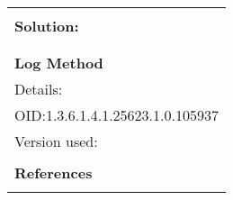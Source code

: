 \documentclass{article}
\begin{document}
\begin{longtable}{|p{}|}
          \hline
          \\
\textbf{Solution:}\\
\\


        \hline
        \\
\textbf{Log Method}\\
Details:
\rowcolor{white}{\verb=OS Detection Consolidation and Reporting=}\\
OID:1.3.6.1.4.1.25623.1.0.105937\\
Version used:
\rowcolor{white}{\verb=2022-04-05T09:27:51Z=}\\

      \hline
      \\
\textbf{References}\\
\rowcolor{white}{\verb=url: https://community.greenbone.net/c/vulnerability-tests=}\\
\end{longtable}
\end{document}
